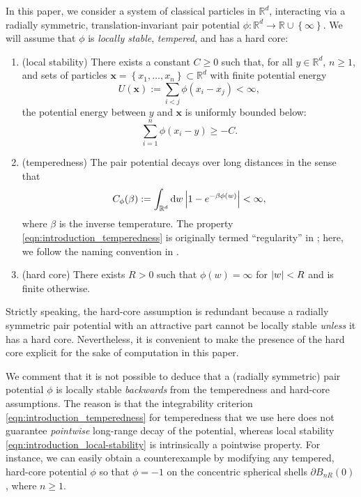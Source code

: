 \documentclass[11pt]{article}
\newcommand{\R}{\mathbb R}
\newcommand{\lsconst}{C}
\newcommand{\hcconst}{R}
\newcommand{\set}[1]{\left\{#1\right\}}
\numberwithin{equation}{section}
\theoremstyle{plain}
\theoremstyle{definition}
\theoremstyle{remark}
\begin{document}
In this paper, we consider a system of classical particles in $\R^{d}$, interacting via a radially symmetric, translation-invariant pair potential $\phi:\R^{d}\rightarrow\R\cup\set{\infty}$.
We will assume that $\phi$ is \emph{locally stable}, \emph{tempered}, and has a hard core:
\begin{enumerate}
\item (local stability) There exists a constant $\lsconst\ge0$ such that, for all $y\in\R^{d}$, $n\ge 1$, and sets of particles $\bm{x}=\set{x_{1},\dots,x_{n}}\subset\R^{d}$ with finite potential energy 
\begin{equation}
\label{eqn:introduction_potential-energy}
U(\bm{x}):=\sum_{i<j}\phi(x_{i}-x_{j})<\infty,
\end{equation} 
the potential energy between $y$ and $\bm{x}$ is uniformly bounded below:
\begin{equation}
\label{eqn:introduction_local-stability}
\sum_{i=1}^{n}\phi(x_{i}-y)\ge -\lsconst.
\end{equation}
\item (temperedness) The pair potential decays over long distances in the sense that
\begin{equation}
\label{eqn:introduction_temperedness}
C_{\phi}(\beta):=\int_{\R^{d}}\dd{w}\abs{1-e^{-\beta\phi(w)}}<\infty,
\end{equation}
where $\beta$ is the inverse temperature.
The property \eqref{eqn:introduction_temperedness} is originally termed ``regularity'' in \cite[\S4.1]{ruelle1969statistical}; here, we follow the naming convention in \cite{michelen2023analyticity}.
\item (hard core) There exists $\hcconst>0$ such that $\phi(w)=\infty$ for $\abs{w}<\hcconst$ and is finite otherwise.
\end{enumerate}

Strictly speaking, the hard-core assumption is redundant because a radially symmetric pair potential with an attractive part cannot be locally stable \emph{unless} it has a hard core.
Nevertheless, it is convenient to make the presence of the hard core explicit for the sake of computation in this paper.

We comment that it is not possible to deduce that a (radially symmetric) pair potential $\phi$ is locally stable \emph{backwards} from the temperedness and hard-core assumptions.
The reason is that the integrability criterion \eqref{eqn:introduction_temperedness} for temperedness that we use here does not guarantee \emph{pointwise} long-range decay of the potential, whereas local stability \eqref{eqn:introduction_local-stability} is intrinsically a pointwise property.
For instance, we can easily obtain a counterexample by modifying any tempered, hard-core potential $\phi$ so that $\phi=-1$ on the concentric spherical shells $\partial B_{nR}(0)$, where $n\ge 1$.
\end{document}
